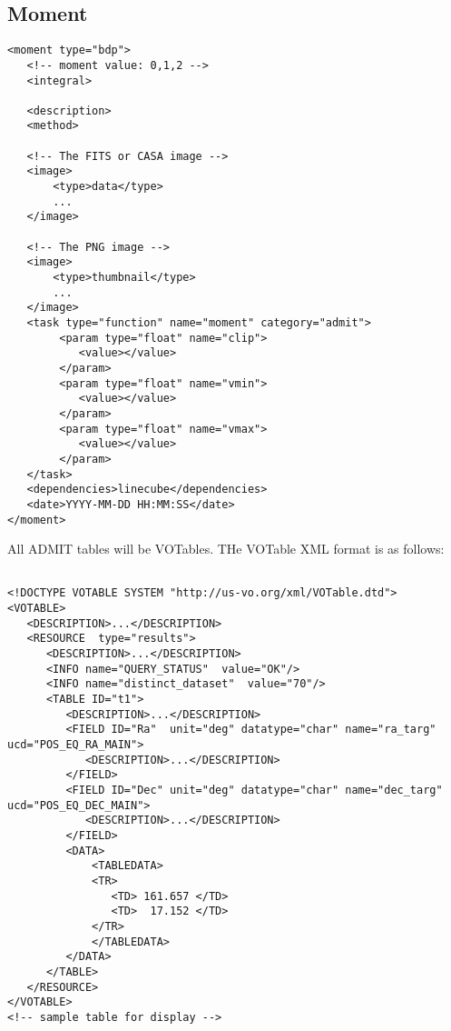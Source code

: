 \documentclass{article}
\begin{document}
\subsection{Moment}
\footnotesize
\begin{verbatim}
<moment type="bdp">
   <!-- moment value: 0,1,2 -->
   <integral>          

   <description>
   <method>

   <!-- The FITS or CASA image -->
   <image> 
       <type>data</type>
       ...
   </image>  

   <!-- The PNG image -->
   <image> 
       <type>thumbnail</type>
       ...
   </image>  
   <task type="function" name="moment" category="admit">
        <param type="float" name="clip">
           <value></value>
        </param>
        <param type="float" name="vmin">
           <value></value>
        </param>
        <param type="float" name="vmax">
           <value></value>
        </param>
   </task>
   <dependencies>linecube</dependencies>
   <date>YYYY-MM-DD HH:MM:SS</date>
</moment>
\end{verbatim}



All ADMIT tables will be VOTables. THe VOTable XML format is as follows:

\begin{verbatim}

<!DOCTYPE VOTABLE SYSTEM "http://us-vo.org/xml/VOTable.dtd">
<VOTABLE>
   <DESCRIPTION>...</DESCRIPTION>
   <RESOURCE  type="results">
      <DESCRIPTION>...</DESCRIPTION>
      <INFO name="QUERY_STATUS"  value="OK"/>
      <INFO name="distinct_dataset"  value="70"/>
      <TABLE ID="t1">
         <DESCRIPTION>...</DESCRIPTION>
         <FIELD ID="Ra"  unit="deg" datatype="char" name="ra_targ"  ucd="POS_EQ_RA_MAIN"> 
            <DESCRIPTION>...</DESCRIPTION>
         </FIELD>
         <FIELD ID="Dec" unit="deg" datatype="char" name="dec_targ" ucd="POS_EQ_DEC_MAIN">
            <DESCRIPTION>...</DESCRIPTION>
         </FIELD>
         <DATA>
             <TABLEDATA>
             <TR>
                <TD> 161.657 </TD>
                <TD>  17.152 </TD>
             </TR>
             </TABLEDATA>
         </DATA>
      </TABLE>
   </RESOURCE>
</VOTABLE>
<!-- sample table for display -->
         

\end{verbatim}
\end{document}
